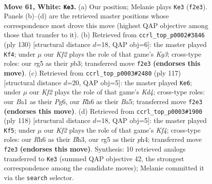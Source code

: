\documentclass[11pt]{article}
\begin{document}
\clearpage

\begin{figure}[p]\centering
\begin{subfigure}{0.46\textwidth}\centering
\resizebox{\linewidth}{!}{%
\newchessgame
\chessboard[
  setfen={4k3/8/7R/pp4r1/b1p5/P1P5/5K2/B7 w - - 28 61},
  showmover=false,
  pgfstyle=straightmove, color=movearrow, markmove={f2-e3}
]}
\caption{}
\end{subfigure}\hfill
\begin{subfigure}{0.46\textwidth}\centering
\resizebox{\linewidth}{!}{%
\newchessgame
\chessboard[
  setfen={8/2k2p1p/4b1pP/6P1/R7/1p4K1/8/8 w - - 2 66},
  showmover=false,
  pgfstyle=straightmove, color=movearrow, markmove={g3-f4}
]}
\caption{}
\end{subfigure}
\\[4pt]
\begin{subfigure}{0.46\textwidth}\centering
\resizebox{\linewidth}{!}{%
\newchessgame
\chessboard[
  setfen={8/8/6p1/b2k1p1p/7B/4PPP1/7P/2K5 b - - 49 59},
  showmover=false,
  pgfstyle=straightmove, color=movearrow, markmove={d5-e6}
]}
\caption{}
\end{subfigure}\hfill
\begin{subfigure}{0.46\textwidth}\centering
\resizebox{\linewidth}{!}{%
\newchessgame
\chessboard[
  setfen={3k4/5p2/1p6/p1b1P3/P4K1p/1P5B/8/8 w - - 36 60},
  showmover=false,
  pgfstyle=straightmove, color=movearrow, markmove={f4-f5}
]}
\caption{}
\end{subfigure}
\caption{\textbf{Move 61, White: \texttt{Ke3}.} (a) Our position; Melanie plays \texttt{Ke3} (\texttt{f2e3}). Panels (b)--(d) are the retrieved master positions whose correspondence most drove this move (highest QAP objective among those that transfer to it). (b) Retrieved from \texttt{ccrl\_top\_p0002\#3846} (ply 130) [structural distance $d$=18, QAP obj=6]: the master played \texttt{Kf4}; under $\mu$ our \emph{Kf2} plays the role of that game's \emph{Kg3}; cross-type roles: our \emph{r}g5 as their \emph{p}b3; transferred move \texttt{f2e3} \textbf{(endorses this move)}. (c) Retrieved from \texttt{ccrl\_top\_p0003\#2480} (ply 117) [structural distance $d$=20, QAP obj=5]: the master played \texttt{Ke6}; under $\mu$ our \emph{Kf2} plays the role of that game's \emph{Kd4}; cross-type roles: our \emph{B}a1 as their \emph{P}g6, our \emph{R}h6 as their \emph{B}a5; transferred move \texttt{f2e3} \textbf{(endorses this move)}. (d) Retrieved from \texttt{ccrl\_top\_p0003\#1900} (ply 118) [structural distance $d$=18, QAP obj=5]: the master played \texttt{Kf5}; under $\mu$ our \emph{Kf2} plays the role of that game's \emph{Kf4}; cross-type roles: our \emph{R}h6 as their \emph{B}h3, our \emph{r}g5 as their \emph{p}h4; transferred move \texttt{f2e3} \textbf{(endorses this move)}. Synthesis: 10 retrieved analogs transferred to \texttt{Ke3} (summed QAP objective 42, the strongest correspondence among the candidate moves); Melanie committed it via the \texttt{search} selector.}
\label{fig:thought-m120}
\end{figure}
\end{document}
